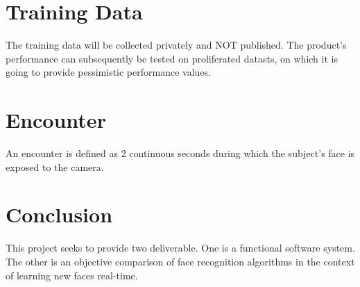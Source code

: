 \documentclass{article}
\begin{document}
\section{Training Data}
The training data will be collected privately and NOT published.
The product's performance can subsequently be tested on proliferated datasts, on which it is going to provide pessimistic performance values.

\section{Encounter}
An encounter is defined as 2 continuous seconds during which the subject's face is exposed to the camera.

\section{Conclusion}
This project seeks to provide two deliverable.
One is a functional software system.
The other is an objective comparison of face recognition algorithms in the context of learning new faces real-time.
\end{document}
